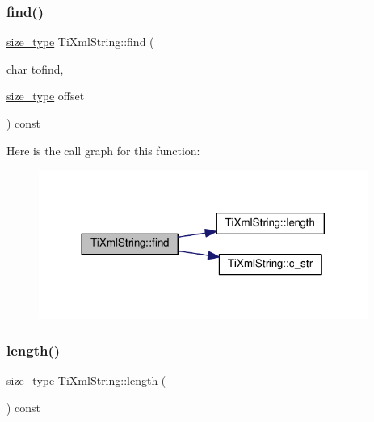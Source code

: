 \mbox{\label{class_ti_xml_string_a2d66cfd6986faceda62ca62db553a921}} 
\subsubsection{\texorpdfstring{find()}{find()}\hspace{0.1cm}{\footnotesize\ttfamily [2/2]}}
{\footnotesize\ttfamily \hyperlink{class_ti_xml_string_abeb2c1893a04c17904f7c06546d0b971}{size\+\_\+type} Ti\+Xml\+String\+::find (\begin{DoxyParamCaption}\item[{char}]{tofind,  }\item[{\hyperlink{class_ti_xml_string_abeb2c1893a04c17904f7c06546d0b971}{size\+\_\+type}}]{offset }\end{DoxyParamCaption}) const\hspace{0.3cm}{\ttfamily [inline]}}

Here is the call graph for this function\+:\nopagebreak
\begin{figure}[H]
\begin{center}
\leavevmode
\includegraphics[width=305pt]{class_ti_xml_string_a2d66cfd6986faceda62ca62db553a921_cgraph}
\end{center}
\end{figure}
\mbox{\label{class_ti_xml_string_a5db17f8314ffe2a89df0f0eb6c2a4bf5}} 
\subsubsection{\texorpdfstring{length()}{length()}}
{\footnotesize\ttfamily \hyperlink{class_ti_xml_string_abeb2c1893a04c17904f7c06546d0b971}{size\+\_\+type} Ti\+Xml\+String\+::length (\begin{DoxyParamCaption}{ }\end{DoxyParamCaption}) const\hspace{0.3cm}{\ttfamily [inline]}}

